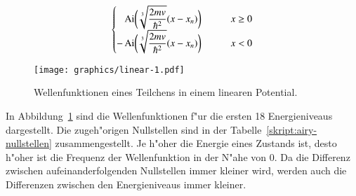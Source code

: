\begin{loesung}
\begin{equation}
\begin{cases}
\displaystyle
\phantom{-}\operatorname{Ai}\biggl( \root3\of{\frac{2mv}{\hbar^2}} (x-x_n)\biggr)
	&\qquad x\ge 0\\
\displaystyle
-\operatorname{Ai}\biggl( \root3\of{\frac{2mv}{\hbar^2}}(x-x_n)\biggr)
	&\qquad x < 0
\end{cases}
\end{equation}
\begin{figure}
\centering
\texttt{[image: graphics/linear-1.pdf]}
\caption{Wellenfunktionen eines Teilchens in einem linearen Potential.
\label{skript:linear-wave-functions}}
\end{figure}%
In Abbildung~\ref{skript:linear-wave-functions} sind die Wellenfunktionen
f"ur die ersten 18 Energieniveaus dargestellt.
Die zugeh"origen Nullstellen sind in der Tabelle~\ref{skript:airy-nullstellen}
zusammengestellt.
Je h"oher die Energie eines Zustands ist, desto h"oher ist die Frequenz
der Wellenfunktion in der N"ahe von $0$.
Da die Differenz zwischen aufeinanderfolgenden Nullstellen immer kleiner
wird, werden auch die Differenzen zwischen den Energieniveaus immer kleiner.
\end{loesung}

